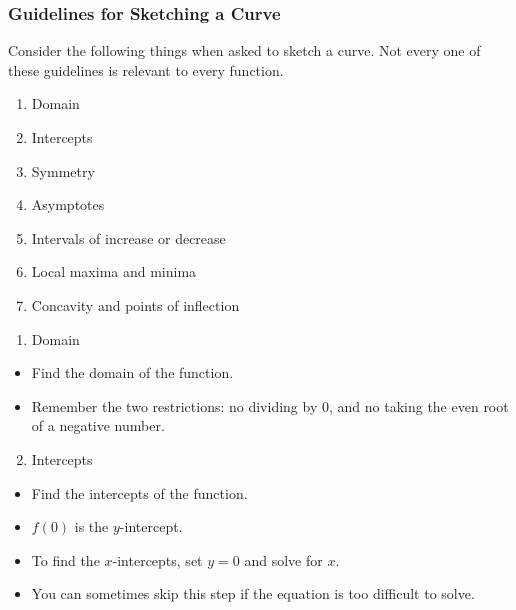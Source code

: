 \begin{frame}
\frametitle{Guidelines for Sketching a Curve}
Consider the following things when asked to sketch a curve.  Not every one of these guidelines is relevant to every function.
\begin{enumerate}
\item  Domain
\item  Intercepts
\item  Symmetry
\item  Asymptotes
\item  Intervals of increase or decrease
\item  Local maxima and minima
\item  Concavity and points of inflection
\end{enumerate}
\end{frame}

\begin{frame}[t]
\begin{enumerate}
\item  Domain
\end{enumerate}
\begin{itemize}
\item  Find the domain of the function.  
\item  Remember the two restrictions: no dividing by $0$, and no taking the even root of a negative number.
\end{itemize}
\end{frame}


\begin{frame}[t]
\begin{enumerate}
\setcounter{enumi}{1}
\item  Intercepts
\end{enumerate}
\begin{itemize}
\item  Find the intercepts of the function.
\item  $f(0)$ is the $y$-intercept.
\item  To find the $x$-intercepts, set $y = 0$ and solve for $x$.
\item  You can sometimes skip this step if the equation is too difficult to solve.
\end{itemize}
\end{frame}


